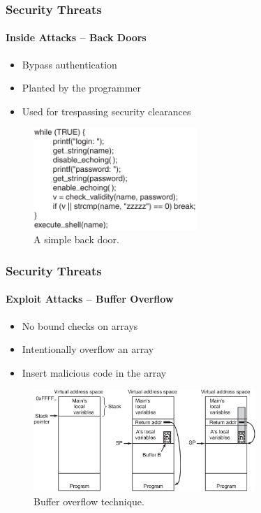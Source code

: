 \documentclass{beamer}
\begin{document}
	\begin{frame}
	\frametitle{Security Threats}
	\framesubtitle{Inside Attacks -- Back Doors}
	\begin{itemize}
	\setlength\itemsep{0.5em}
		\item Bypass authentication
		\item Planted by the programmer
		\item Used for trespassing security clearances
	\end{itemize}
	\begin{figure}
		\centering
		\includegraphics[width=0.55\textwidth]{back-door}
		\caption{A simple back door.}
	\end{figure}
	\end{frame}

	\begin{frame}
	\frametitle{Security Threats}
	\framesubtitle{Exploit Attacks -- Buffer Overflow}
	\begin{itemize}
	\setlength\itemsep{0.5em}
		\item No bound checks on arrays
		\item Intentionally overflow an array
		\item Insert malicious code in the array
	\end{itemize}
	\begin{figure}
		\centering
		\includegraphics[width=0.75\textwidth]{buffer-overflow}
		\caption{Buffer overflow technique.}
	\end{figure}
	\end{frame}
\end{document}
